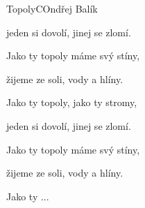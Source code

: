 \begin{song}{Topoly}{C}{Ondřej Balík}
\begin{multicols}{2}
\begin{scriptsize}
\begin{SBVerse}
jeden si dovolí, jinej se zlomí.

Jako ty topoly máme svý stíny,

žijeme ze soli, vody a hlíny.

Jako ty topoly, jako ty stromy,

jeden si dovolí, jinej se zlomí.

Jako ty topoly máme svý stíny,

žijeme ze soli, vody a hlíny.

Jako ty ...
\end{SBVerse}
\end{scriptsize}
\end{multicols}
\end{song}

\pagebreak
